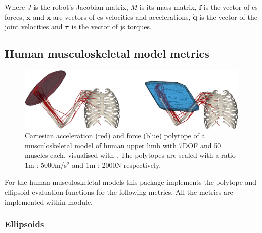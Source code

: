 Where $J$ is the robot's Jacobian matrix, $M$ is its mass matrix, $\bm{f}$ is the vector of \gls{cs} forces, $\dot{\bm{x}}$ and $\ddot{\bm{x}}$ are vectors of \gls{cs} velocities and accelerations, $\dot{\bm{q}}$ is the vector of the joint velocities and $\bm{\tau}$ is the vector of \gls{js} torques.

\subsection{Human musculoskeletal model metrics}
\label{sec:pycapacity_human}

\begin{figure}[!h]
    \centering
    \includegraphics[width=\linewidth]{Papers/images/force_acceleration.png}
    \caption{Cartesian acceleration (red) and force (blue) polytope of a musculoskeletal model of human upper limb with 7DOF and 50 muscles each, visualised with . The polytopes are scaled with a ratio 1m : 5000m/s$^2$ and 1m : 2000N respectively.}
    \label{fig:force_polytope_human_revisit}
\end{figure}

For the human musculoskeletal models this package implements the polytope and ellipsoid evaluation functions for the following metrics. All the metrics are implemented within  module.

\subsubsection*{Ellipsoids}

